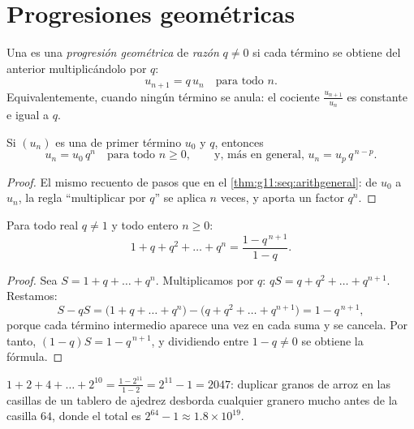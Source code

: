 \section{Progresiones geométricas}

\begin{definition}\label{def:g11:seq:geometric}
Una  es una \emph{progresión geométrica} de \emph{razón} $q \neq 0$ si cada término se
obtiene del anterior multiplicándolo por $q$:
\[
u_{n+1} = q\,u_n \quad \text{para todo } n.
\]
Equivalentemente, cuando ningún término se anula: el cociente
$\frac{u_{n+1}}{u_n}$ es constante e igual a $q$.
\end{definition}

\begin{theorem}\label{thm:g11:seq:geomgeneral}
Si $(u_n)$ es una  de primer término $u_0$ y 
$q$, entonces
\[
u_n = u_0\, q^n \quad \text{para todo } n \geq 0,
\qquad\text{y, más en general, } u_n = u_p\, q^{\,n-p} .
\]
\end{theorem}

\begin{proof}
El mismo recuento de pasos que en el \cref{thm:g11:seq:arithgeneral}: de
$u_0$ a $u_n$, la regla ``multiplicar por $q$'' se aplica $n$ veces, y
aporta un factor $q^n$.
\end{proof}

\begin{theorem}\label{thm:g11:seq:geomsum}
Para todo real $q \neq 1$ y todo entero $n \geq 0$:
\[
1 + q + q^2 + \dots + q^n = \frac{1 - q^{\,n+1}}{1 - q}.
\]
\end{theorem}

\begin{proof}
Sea $S = 1 + q + \dots + q^n$. Multiplicamos por $q$:
$qS = q + q^2 + \dots + q^{n+1}$. Restamos:
\[
S - qS = \bigl(1 + q + \dots + q^n\bigr)
- \bigl(q + q^2 + \dots + q^{n+1}\bigr) = 1 - q^{\,n+1},
\]
porque cada término intermedio aparece una vez en cada suma y se cancela.
Por tanto, $(1 - q)S = 1 - q^{\,n+1}$, y dividiendo entre $1 - q \neq 0$
se obtiene la fórmula.
\end{proof}

\begin{example}\label{ex:g11:seq:chessboard}
$1 + 2 + 4 + \dots + 2^{10} = \frac{1 - 2^{11}}{1 - 2} = 2^{11} - 1 =
2047$: duplicar granos de arroz en las casillas de un tablero de ajedrez
desborda cualquier granero mucho antes de la casilla $64$, donde el total
es $2^{64} - 1 \approx 1.8 \times 10^{19}$.
\end{example}

